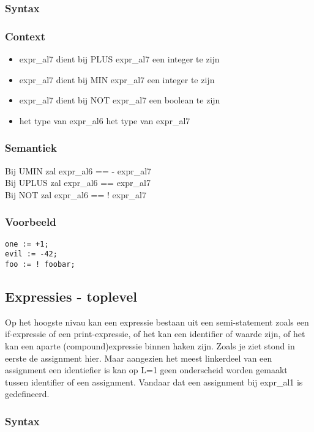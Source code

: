 \documentclass[]{article}
\begin{document}
\subsubsection{Syntax}

\subsubsection{Context}
\begin{itemize}
\item expr\_al7 dient bij PLUS expr\_al7 een integer te zijn
\item expr\_al7 dient bij MIN expr\_al7 een integer te zijn
\item expr\_al7 dient bij NOT expr\_al7 een boolean te zijn
\item het type van expr\_al6 het type van expr\_al7
\end{itemize}
\subsubsection{Semantiek}
Bij UMIN zal expr\_al6 == - expr\_al7 \\
Bij UPLUS zal expr\_al6 == expr\_al7 \\
Bij NOT zal expr\_al6 == ! expr\_al7 
\subsubsection{Voorbeeld}
\begin{lstlisting}[style=SELMA]
one := +1;
evil := -42;
foo := ! foobar;
\end{lstlisting}

\subsection{Expressies - toplevel}
Op het hoogste nivau kan een expressie bestaan uit een semi-statement zoals een if-expressie of een print-expressie, of het kan een identifier of waarde zijn, of het kan een aparte (compound)expressie binnen haken zijn.
Zoals je ziet stond in eerste de assignment hier. Maar aangezien het meest linkerdeel van een assignment een identiefier is kan op L=1 geen onderscheid worden gemaakt tussen identifier of een assignment. Vandaar dat een assignment bij expr\_al1 is gedefineerd.
\subsubsection{Syntax}

\end{document}

